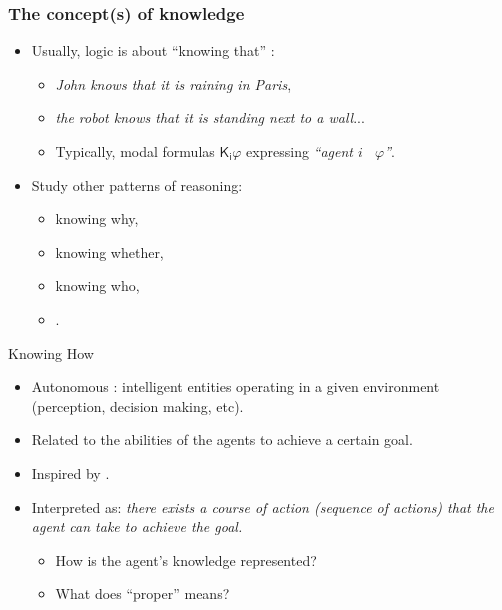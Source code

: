 \documentclass{beamer}
\begin{document}
\begin{frame}
    \frametitle{The concept(s) of knowledge}
    
    \begin{small}
    \begin{itemize}
        \item Usually,  logic is about ``knowing that'' : 
            \begin{itemize}
                \item \emph{John knows that it is raining in Paris}, 
                \item \emph{the robot knows that it is standing next to a wall}... \pause
                \item Typically, modal formulas $\mathsf{K_i}\varphi$ expressing \emph{``agent $i$ ~$\varphi$''}.
            \end{itemize} \pause
       \item Study other patterns of reasoning: 
        \begin{itemize}
            \item knowing why, 
            \item knowing whether, 
            \item knowing who, 
            \item {}.
        \end{itemize}
    \end{itemize}
    
    \end{small}
        
    \end{frame}


\begin{frame}{Knowing How}
    \begin{small}
    \begin{itemize}
        \item Autonomous : intelligent entities operating in a given en\-vir\-on\-ment (perception, decision making, etc).
        \item Related to the abilities of the agents to achieve a certain goal.
        \item Inspired by .
        \item Interpreted as: \emph{there exists a  course of action (sequence of actions) that the agent can take to achieve the goal.} \pause
            \begin{itemize}
                \item How is the agent's knowledge represented?
                \item What does ``proper'' means?
            \end{itemize}
    \end{itemize}
\end{small}
\end{frame}
\end{document}
